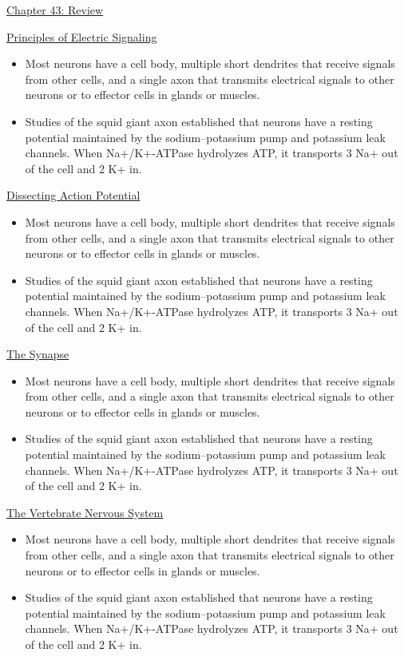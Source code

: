 \documentclass[12pt,letterpaper]{article}
\begin{document}
\hypertarget{43.r}{}
\begin{probbox}{\hyperlink{43}{Chapter 43: Review}}{
    \hyperlink{43.1}{Principles of Electric Signaling}
    \begin{itemize}
        \item Most neurons have a cell body, multiple short dendrites that receive signals from other cells, and a single axon that transmits electrical signals to other neurons or to effector cells in glands or muscles. 
        \item Studies of the squid giant axon established that neurons have a resting potential maintained by the sodium–potassium pump and potassium leak channels. When Na+/K+-ATPase hydrolyzes ATP, it transports 3 Na+ out of the cell and 2 K+ in.
    \end{itemize}
    \hyperlink{43.2}{Dissecting Action Potential}
    \begin{itemize}
        \item Most neurons have a cell body, multiple short dendrites that receive signals from other cells, and a single axon that transmits electrical signals to other neurons or to effector cells in glands or muscles. 
        \item Studies of the squid giant axon established that neurons have a resting potential maintained by the sodium–potassium pump and potassium leak channels. When Na+/K+-ATPase hydrolyzes ATP, it transports 3 Na+ out of the cell and 2 K+ in.     
    \end{itemize}
    \hyperlink{43.3}{The Synapse}
    \begin{itemize}
        \item Most neurons have a cell body, multiple short dendrites that receive signals from other cells, and a single axon that transmits electrical signals to other neurons or to effector cells in glands or muscles. 
        \item Studies of the squid giant axon established that neurons have a resting potential maintained by the sodium–potassium pump and potassium leak channels. When Na+/K+-ATPase hydrolyzes ATP, it transports 3 Na+ out of the cell and 2 K+ in.
    \end{itemize}
    \hyperlink{43.4}{The Vertebrate Nervous System}
    \begin{itemize}
        \item Most neurons have a cell body, multiple short dendrites that receive signals from other cells, and a single axon that transmits electrical signals to other neurons or to effector cells in glands or muscles. 
        \item Studies of the squid giant axon established that neurons have a resting potential maintained by the sodium–potassium pump and potassium leak channels. When Na+/K+-ATPase hydrolyzes ATP, it transports 3 Na+ out of the cell and 2 K+ in.
    \end{itemize}
}\end{probbox}
\end{document}
